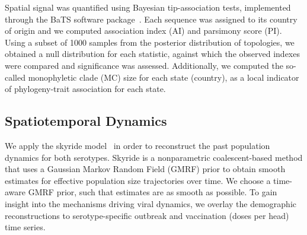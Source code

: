 \documentclass[10pt]{article}
\begin{document}
Spatial signal was quantified using Bayesian tip-association tests, implemented through the BaTS software package~\cite{bats}.
Each sequence was assigned to its country of origin and we computed association index (AI) and parsimony score (PI).
Using a subset of 1000 samples from the posterior distribution of topologies, we obtained a null distribution for each statistic, against which the observed indexes were compared and significance was assessed.
Additionally, we computed the so-called monophyletic clade (MC) size for each state (country), as a local indicator of phylogeny-trait association for each state.


\subsection*{Spatiotemporal Dynamics}

We apply the 
skyride model~\cite{skyride} in order to reconstruct the past population dynamics for both serotypes. Skyride is a nonparametric coalescent-based method that uses a Gaussian Markov Random Field (GMRF) prior to obtain smooth estimates for effective population size trajectories over time. We choose a time-aware GMRF prior, such that estimates are as smooth as possible.
To gain insight into the mechanisms driving viral dynamics, we overlay the demographic reconstructions to serotype-specific outbreak and vaccination (doses per head) time series.
\end{document}
